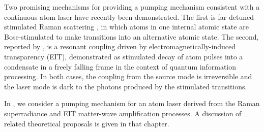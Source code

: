 Two promising mechanisms for providing a pumping mechanism consistent with a continuous atom laser have recently been demonstrated.  The first is far-detuned stimulated Raman scattering \citep{Schneble:2004,Yoshikawa:2004}, in which atoms in one internal atomic state are Bose-stimulated to make transitions into an alternative atomic state.  The second, reported by \citet{Ginsberg:2007fk}, is a resonant coupling driven by electromagnetically-induced transparency (EIT), demonstrated as stimulated decay of atom pulses into a condensate in a freely falling frame in the context of quantum information processing.  In both cases, the coupling from the source mode is irreversible and the laser mode is dark to the photons produced by the stimulated transitions.

In , we consider a pumping mechanism for an atom laser derived from the Raman superradiance and EIT matter-wave amplification processes.  A discussion of related theoretical proposals is given in that chapter.

